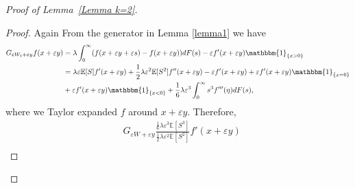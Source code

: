 \documentclass[11pt,letterpaper,reqno]{article}
\theoremstyle{thmstyleone}%
\theoremstyle{thmstyletwo}%
\theoremstyle{thmstylethree}%
\numberwithin{equation}{section}
\begin{document}
\begin{proof}[Proof of Lemma~\ref{Lemma k=2}]
\begin{proof}
Again From the generator in Lemma \ref{lemma1} we have
\begin{align}\label{e2.1}
    G_{\varepsilon W_t+\varepsilon y}f(x+\varepsilon y)&=\lambda \int_0^\infty (f(x+\varepsilon y +\varepsilon s)-f(x+\varepsilon y))dF(s)-\varepsilon f'(x+\varepsilon y)\mathbbm{1}_{\{x>0\}}\\
  \nonumber   &=\lambda \varepsilon \mathbb E[S]f'(x+\varepsilon y)+\frac{1}{2}\lambda \varepsilon^2 \mathbb E[S^2]f''(x+\varepsilon y)-\varepsilon f'(x+\varepsilon y)+\varepsilon f'(x+\varepsilon y)\mathbbm{1}_{\{x=0\}} \nonumber \\
  &+\varepsilon f'(x+\varepsilon y)\mathbbm{1}_{\{x<0\}}
  +\frac{1}{6}\lambda \varepsilon^3 \int_0^\infty s^3 f'''(\eta)dF(s),
\end{align}
where we Taylor expanded $f$ around $x+\varepsilon y$. Therefore,
\begin{align*}
  & G_{\varepsilon W+\varepsilon y}\frac{\frac{1}{6}\lambda \varepsilon^3 \mathbb E[S^3]}{\frac{1}{2}\lambda \varepsilon^2 \mathbb E[S^2]}f'(x+\varepsilon y)\\

\end{align*}
\end{proof}
\end{proof}
\end{document}
